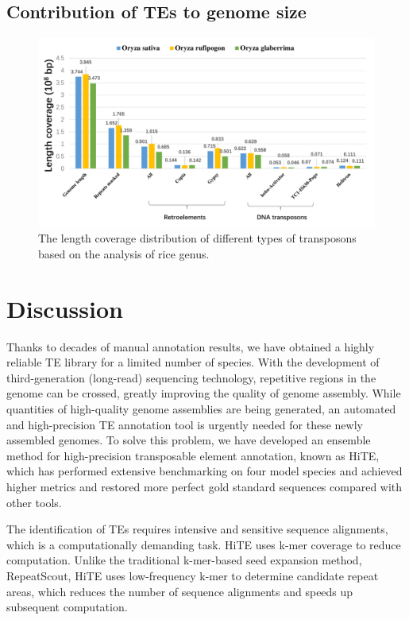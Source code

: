 \documentclass{bmcart}
\begin{document}
\subsection*{Contribution of TEs to genome size}

\begin{figure}[h!]
	\centerline{\includegraphics[width=1.0\textwidth]{figures/RiceDiff.pdf}}
	\caption{The length coverage distribution of different types of transposons based on the analysis of rice genus.}
	\label{fig:rice_diff}
\end{figure}


\section*{Discussion}
Thanks to decades of manual annotation results, we have obtained a highly reliable TE library for a limited number of species. With the development of third-generation (long-read) sequencing technology, repetitive regions in the genome can be crossed, greatly improving the quality of genome assembly. While quantities of high-quality genome assemblies are being generated, an automated and high-precision TE annotation tool is urgently needed for these newly assembled genomes. To solve this problem, we have developed an ensemble method for high-precision transposable element annotation, known as HiTE, which has performed extensive benchmarking on four model species and achieved higher metrics and restored more perfect gold standard sequences compared with other tools.

The identification of TEs requires intensive and sensitive sequence alignments, which is a computationally demanding task. HiTE uses k-mer coverage to reduce computation. Unlike the traditional k-mer-based seed expansion method, RepeatScout, HiTE uses low-frequency k-mer to determine candidate repeat areas, which reduces the number of sequence alignments and speeds up subsequent computation. 
\end{document}

